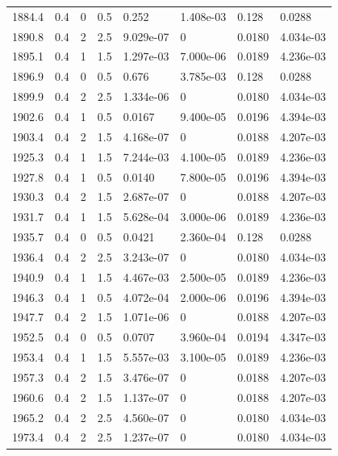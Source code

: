 \documentclass[preview]{standalone}
\begin{document}
{{{{{{\begin{tabular}{L{1.2cm}C{1.2cm} C{0.3cm}C{0.5cm} C{1.4cm}C{1.4cm} C{1.4cm}C{1.4cm}}
  1884.4  &   0.4  & 0     & 0.5 &  0.252  & 1.408e-03  & 0.128 &  0.0288   \\ 
  1890.8  &   0.4  & 2     & 2.5 &  9.029e-07  & 0  & 0.0180 &  4.034e-03   \\ 
  1895.1  &   0.4  & 1     & 1.5 &  1.297e-03  & 7.000e-06  & 0.0189 &  4.236e-03   \\ 
  1896.9  &   0.4  & 0     & 0.5 &  0.676  & 3.785e-03  & 0.128 &  0.0288   \\ 
  1899.9  &   0.4  & 2     & 2.5 &  1.334e-06  & 0  & 0.0180 &  4.034e-03   \\ 
  1902.6  &   0.4  & 1     & 0.5 &  0.0167  & 9.400e-05  & 0.0196 &  4.394e-03   \\ 
  1903.4  &   0.4  & 2     & 1.5 &  4.168e-07  & 0  & 0.0188 &  4.207e-03   \\ 
  1925.3  &   0.4  & 1     & 1.5 &  7.244e-03  & 4.100e-05  & 0.0189 &  4.236e-03   \\ 
  1927.8  &   0.4  & 1     & 0.5 &  0.0140  & 7.800e-05  & 0.0196 &  4.394e-03   \\ 
  1930.3  &   0.4  & 2     & 1.5 &  2.687e-07  & 0  & 0.0188 &  4.207e-03   \\ 
  1931.7  &   0.4  & 1     & 1.5 &  5.628e-04  & 3.000e-06  & 0.0189 &  4.236e-03   \\ 
  1935.7  &   0.4  & 0     & 0.5 &  0.0421  & 2.360e-04  & 0.128 &  0.0288   \\ 
  1936.4  &   0.4  & 2     & 2.5 &  3.243e-07  & 0  & 0.0180 &  4.034e-03   \\ 
  1940.9  &   0.4  & 1     & 1.5 &  4.467e-03  & 2.500e-05  & 0.0189 &  4.236e-03   \\ 
  1946.3  &   0.4  & 1     & 0.5 &  4.072e-04  & 2.000e-06  & 0.0196 &  4.394e-03   \\ 
  1947.7  &   0.4  & 2     & 1.5 &  1.071e-06  & 0  & 0.0188 &  4.207e-03   \\ 
  1952.5  &   0.4  & 0     & 0.5 &  0.0707  & 3.960e-04  & 0.0194 &  4.347e-03   \\ 
  1953.4  &   0.4  & 1     & 1.5 &  5.557e-03  & 3.100e-05  & 0.0189 &  4.236e-03   \\ 
  1957.3  &   0.4  & 2     & 1.5 &  3.476e-07  & 0  & 0.0188 &  4.207e-03   \\ 
  1960.6  &   0.4  & 2     & 1.5 &  1.137e-07  & 0  & 0.0188 &  4.207e-03   \\ 
  1965.2  &   0.4  & 2     & 2.5 &  4.560e-07  & 0  & 0.0180 &  4.034e-03   \\ 
  1973.4  &   0.4  & 2     & 2.5 &  1.237e-07  & 0  & 0.0180 &  4.034e-03   \\ 

\end{tabular}}}}}}}
\end{document}
